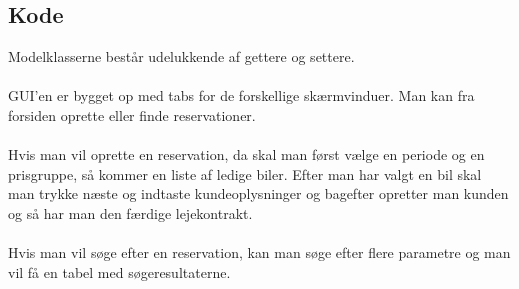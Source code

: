 \documentclass[11pt]{article}
\begin{document}
\subsection*{Kode}
Modelklasserne består udelukkende af gettere og settere.\\\\
GUI'en er bygget op med tabs for de forskellige skærmvinduer. Man kan fra forsiden oprette eller finde reservationer.\\\\
Hvis man vil oprette en reservation, da skal man først vælge en periode og en prisgruppe, så kommer en liste af ledige biler. Efter man har valgt en bil skal man trykke næste og indtaste kundeoplysninger og bagefter opretter man kunden og så har man den færdige lejekontrakt.\\\\
Hvis man vil søge efter en reservation, kan man søge efter flere parametre og man vil få en tabel med søgeresultaterne.
\end{document}
